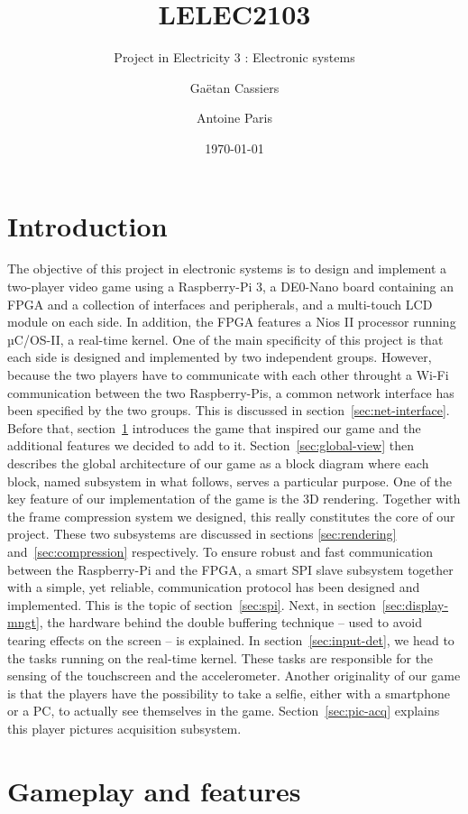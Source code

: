 \documentclass[english, DIV=13]{scrartcl}
\title{LELEC2103}
\subtitle{Project in Electricity 3 : Electronic systems}
\author{Gaëtan Cassiers\and Antoine Paris}
\date{\today}
\begin{document}
\maketitle

\section*{Introduction}
The objective of this project in electronic systems is to design and implement a
two-player video game using a Raspberry-Pi 3, a DE0-Nano board containing an FPGA
and a collection of interfaces and peripherals, and a multi-touch LCD module on
each side. In addition, the FPGA features a Nios II processor running µC/OS-II, a
real-time kernel.
One of the main specificity of this project is that each side is designed and
implemented by two independent groups. However, because the two players have to
communicate with
each other throught a Wi-Fi communication between the two Raspberry-Pis, a common
network interface has been specified by the two groups. This is discussed
in section~\ref{sec:net-interface}. Before that, section~\ref{sec:gameplay-features}
introduces the game that inspired our game and the additional features we decided to
add to it. Section~\ref{sec:global-view} then describes the global architecture of
our game as a block diagram where each block, named subsystem in what follows, serves a
particular purpose. One of the key feature of our implementation of the game is the
3D rendering. Together with the frame compression system we designed, this really
constitutes the core of our project. These two subsystems are discussed in sections
\ref{sec:rendering} and~\ref{sec:compression} respectively.
To ensure robust and fast communication between the Raspberry-Pi and the FPGA, a smart
SPI slave subsystem together with a simple, yet reliable, communication protocol has
been designed and implemented. This is the topic of section~\ref{sec:spi}. Next, in
section~\ref{sec:display-mngt}, the hardware behind the double buffering technique
-- used to avoid tearing effects on the screen -- is explained.
In section~\ref{sec:input-det}, we head to the tasks running on the real-time kernel.
These tasks are responsible for the sensing of the touchscreen and the accelerometer.
Another originality of our game is that the players have the possibility to take a
selfie, either with a smartphone or a PC, to actually see themselves in the game.
Section~\ref{sec:pic-acq} explains this player pictures acquisition subsystem.

\section{Gameplay and features}
\label{sec:gameplay-features}
\end{document}
